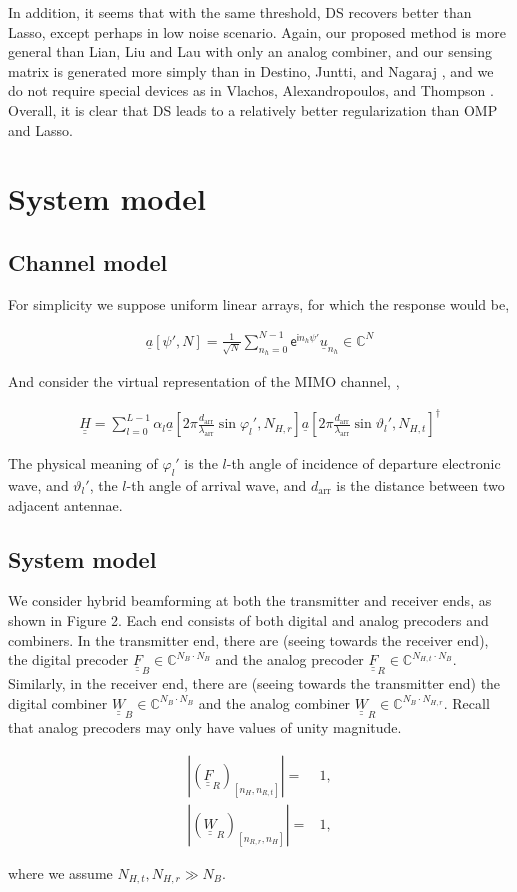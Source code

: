 \documentclass[journal]{IEEEtran}
\renewcommand {\a} {\alpha}
\newcommand {\f} {\varphi}
\renewcommand {\l} {\lambda}
\renewcommand {\th} {\vartheta}
\newcommand {\D} {\cdot}
\newcommand {\m} [1] {\( #1 \)}
\newcommand {\V} [1] {\underline {#1}}
\newcommand {\M} [1] {\underline {\underline {#1}}}
\newcommand {\RB} [1] {\left( #1 \right)}
\newcommand {\SB} [1] {\left[ #1 \right]}
\newcommand {\Nm} [1] {\left \vert #1 \right \vert}
\newcommand {\R} [1] {\sqrt {#1}}
\newcommand {\Disp} [1] {
   \begin {align*}
      #1
   \end {align*}
}
\begin{document}
In addition, it seems that with the same threshold, DS recovers better than Lasso, except perhaps in low noise scenario.
Again, our proposed method is more general than Lian, Liu and Lau \cite {LLL17} with only an analog combiner,
and our sensing matrix is generated more simply than in Destino, Juntti, and Nagaraj \cite {DJN15},
and we do not require special devices as in Vlachos, Alexandropoulos, and Thompson \cite {VAT19}.
Overall, it is clear that DS leads to a relatively better regularization than OMP and Lasso.


\section{System model}

\subsection {Channel model}

For simplicity we suppose uniform linear arrays, for which the response would be,
%
\Disp {
\V {a} \SB {\psi', N}
= \frac {1} {\R {N}} \sum_{n_h=0}^{N-1} \mathsf {e} ^{\mathsf {i} n_h \psi'} \V {u} _{n_h}
\in \mathbb {C} ^ {N} 
}

And consider the virtual representation of the MIMO channel, \cite {ALS14},
%
\Disp {
\M {H}
=\sum_{l=0} ^{L-1}
\a_l
\V {a} \SB { 2\pi \frac {d_{\mathrm {arr}}} {\l _{\mathrm {arr}}} \sin \f_l', N_{H,r}}
\V {a} \SB { 2\pi \frac {d_{\mathrm {arr}}} {\l _{\mathrm {arr}}} \sin \th_l', N_{H,t}}^\dagger 
}
%
The physical meaning of \m {\f_l'} is the \m {l}-th angle of incidence of departure electronic wave, and \m {\th_l'}, the \m {l}-th angle of arrival wave, and \m {d_{\mathrm {arr}}} is the distance between two adjacent antennae.

\subsection {System model}

We consider hybrid beamforming at both the transmitter and receiver ends, as shown in Figure 2.
Each end consists of both digital and analog precoders and combiners.
In the transmitter end, there are (seeing towards the receiver end), the digital precoder \m {\M {F} _B \in \mathbb {C} ^{N_B \D N_B}} and the analog precoder \m {\M {F} _R \in \mathbb {C} ^{N_{H,t} \D N_B}}.
Similarly, in the receiver end, there are (seeing towards the transmitter end) the digital combiner \m {\M {W} _B \in \mathbb {C} ^{N_B \D N_B}} and the analog combiner \m {\M {W} _R \in \mathbb {C} ^{N_B \D N_{H,r}}}.
Recall that analog precoders may only have values of unity magnitude.
%
\Disp {
\Nm {\RB {\M {F} _R} _{\SB {n_H, n_{R,t}}}}
= &1, \\
%
\Nm {\RB {\M {W} _R} _{\SB {n_{R,r}, n_H}}}
= &1,
}
%
where we assume \m {N_{H,t}, N_{H,r} \gg N_B}.
\end{document}
